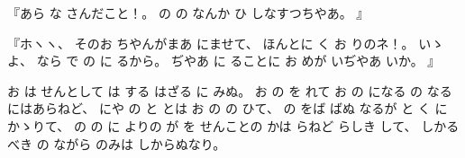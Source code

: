 『あら
な
さんだこと！。
%
の
の
なんか
ひ
しなすつちやあ。
』

『ホヽヽ、
%
そのお
ちやんがまあ
にませて、
%
ほんとに
く
お
りのネ！。
%
いゝよ、
%
なら
で
の
に
るから。
%
ぢやあ
に
ることに
お
めが
いぢやあ
いか。
』

お
は
せんとして
は
する
はざる
に
みぬ。
%
お
の
を
れて
お
の
になる
の
なるにはあらねど、
%
にや
の
と
とは
お
の
の
ひて、
%
の
をば
ばぬ
なるが
と
く
にかゝりて、
%
の
の
に
よりの
が
を
せんことの
かは
らねど
らしき
して、
%
しかるべき
の
ながら
のみは
しからぬなり。
